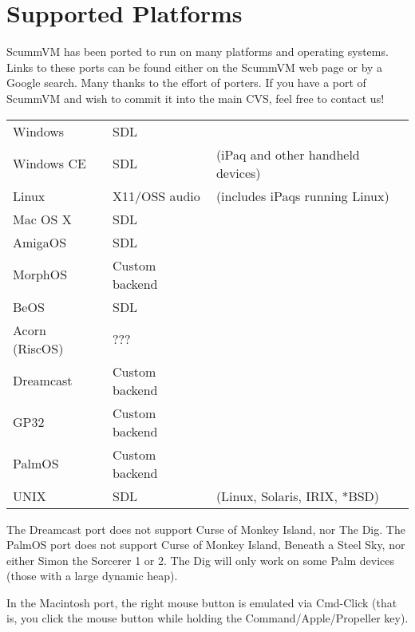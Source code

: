 

\section{Supported Platforms}
ScummVM has been ported to run on many platforms and operating systems.
Links to these ports can be found either on the ScummVM web page or by a
Google search. Many thanks to the effort of porters. If you have a port of
ScummVM and wish to commit it into the main CVS, feel free to contact us!

\begin{tabular}{lll}
Windows         & SDL\\
Windows CE      & SDL           &(iPaq and other handheld devices)\\
Linux           & X11/OSS audio &(includes iPaqs running Linux)\\
Mac OS X        & SDL\\
AmigaOS         & SDL\\
MorphOS         & Custom backend\\
BeOS            & SDL\\
Acorn (RiscOS)  & ???\\
Dreamcast       & Custom backend \\
GP32            & Custom backend\\
PalmOS          & Custom backend\\
UNIX            & SDL    &(Linux, Solaris, IRIX, *BSD)\\
\end{tabular}

The Dreamcast port does not support Curse of Monkey Island, nor The Dig.
The PalmOS port does not support Curse of Monkey Island, Beneath a Steel
Sky, nor either Simon the Sorcerer 1 or 2. The Dig will only work on some
Palm devices (those with a large dynamic heap).

In the Macintosh port, the right mouse button is emulated via Cmd-Click (that
is, you click the mouse button while holding the Command/Apple/Propeller key).
